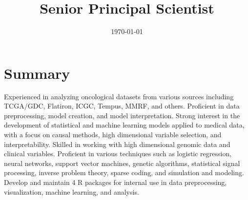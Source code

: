\documentclass{moderncv}
\date{\today}
\title{Senior Principal Scientist}
\begin{document}
\maketitle


\section{Summary}
\label{sec:org77448a8}
Experienced in analyzing oncological datasets from various sources including TCGA/GDC, Flatiron, ICGC, Tempus, MMRF, and others. Proficient in data preprocessing, model creation, and model interpretation. Strong interest in the development of statistical and machine learning models applied to medical data, with a focus on causal methods, high dimensional variable selection, and interpretability. Skilled in working with high dimensional genomic data and clinical variables. Proficient in various techniques such as logistic regression, neural networks, support vector machines, genetic algorithms, statistical signal processing, inverse problem theory, sparse coding, and simulation and modeling. Develop and maintain 4 R packages for internal use in data preprocessing, visualization, machine learning, and analysis.
\end{document}
